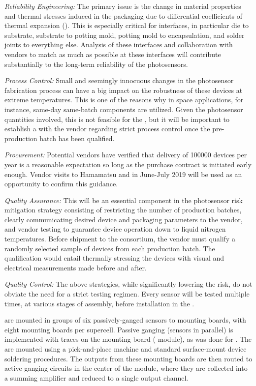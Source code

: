 {\textit{Reliability Engineering:}} The primary issue is the change in material properties and thermal stresses induced in the packaging due to differential coefficients of thermal expansion (). This is especially critical for interfaces, in particular
die to substrate, substrate to potting mold, potting mold to encapsulation, and solder joints to everything else. Analysis of these interfaces and collaboration with vendors to match  as much as possible at these interfaces will contribute substantially to the long-term reliability of the photosensors.

{\textit{Process Control:}} Small and seemingly innocuous
changes in the photosensor fabrication process can have a big impact on the robustness of these devices at extreme temperatures. This is one of the reasons why in space applications, for instance, same-day same-batch components are utilized. Given the photosensor quantities involved, this is not feasible for the  , but
it will be important to establish a  with the vendor regarding 
strict process control once the pre-production batch has been qualified.

{\textit{Procurement:}} Potential vendors have verified that delivery of \num{100000} devices per year is a reasonable expectation so long as the purchase contract is initiated early enough.  Vendor visits to Hamamatsu and  in June-July 2019 will be used as an opportunity to confirm this guidance.

{\textit{Quality Assurance:}} This will be an essential component in the photosensor risk mitigation strategy consisting of restricting the number of production batches, clearly communicating desired device and packaging parameters to the vendor, and vendor testing to
guarantee device operation down to liquid nitrogen temperatures.
Before shipment to the consortium, the vendor 
must qualify a randomly selected sample of devices from each production batch. The qualification would entail thermally stressing the devices 
with visual and electrical measurements made before and after. 

{\textit{Quality Control:}} The above strategies, while significantly lowering the risk, do not obviate the need for a strict testing regimen. Every sensor will be tested multiple times, at various stages of assembly, before installation in the .

 are mounted in groups of six passively-ganged sensors to mounting boards, with eight mounting boards per supercell.  Passive ganging (sensors in parallel) is implemented with traces on the  mounting board ( module), 
as was done for .  The  are mounted using a pick-and-place machine and standard surface-mount device soldering procedures. The outputs from these mounting boards are then routed to active ganging circuits in the center of the  module, where they are collected into a summing amplifier and reduced to a single output channel.

